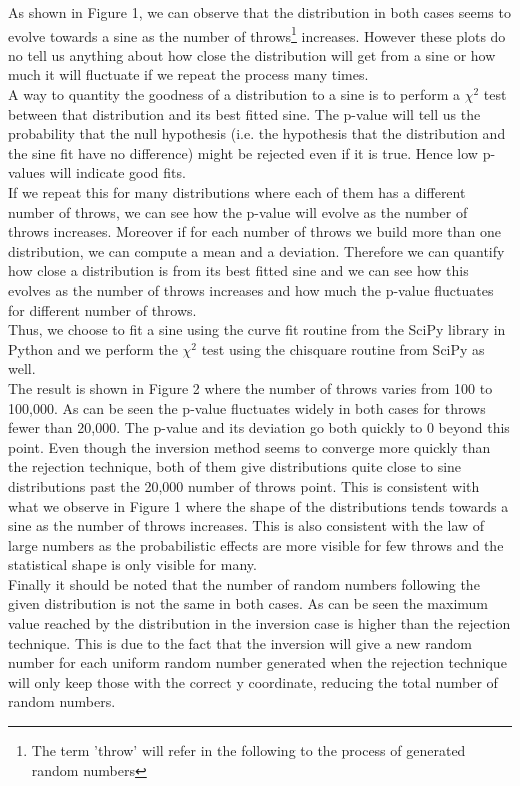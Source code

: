 \documentclass[10 pt]{article}
\numberwithin{equation}{section}
\begin{document}
\begin{multicols}{2}
As shown in Figure 1, we can observe that the distribution in both cases seems to evolve towards a sine as the number of throws\footnote{The term 'throw' will refer in the following to the process of generated random numbers} increases. However these plots do no tell us anything about how close the distribution will get from a sine or how much it will fluctuate if we repeat the process many times.\\
A way to quantity the goodness of a distribution to a sine is to perform a $\chi^2$\cite{Pvalue} test between that distribution and its best fitted sine. The p-value will tell us the probability that the null hypothesis (i.e. the hypothesis that the distribution and the sine fit have no difference) might be rejected even if it is true. Hence low p-values will indicate good fits.\\
If we repeat this for many distributions where each of them has a different number of throws, we can see how the p-value will evolve as the number of throws increases.
Moreover if for each number of throws we build more than one distribution, we can compute a mean and a deviation. Therefore we can quantify how close a distribution is from its best fitted sine and we can see how this evolves as the number of throws increases and how much the p-value fluctuates for different number of throws.
\\Thus, we choose to fit a sine using the curve fit routine from the SciPy library in Python\cite{CF} and we perform the $\chi^2$ test using the chisquare routine from SciPy\cite{CS} as well.\\
The result is shown in Figure 2 where the number of throws varies from 100 to 100,000. As can be seen the p-value fluctuates widely in both cases for throws fewer than 20,000. The p-value and its deviation go both quickly to 0 beyond this point. Even though the inversion method seems to converge more quickly than the rejection technique, both of them give distributions quite close to sine distributions past the 20,000 number of throws point. This is consistent with what we observe in Figure 1 where the shape of the distributions tends towards a sine as the number of throws increases. This is also consistent with the law of large numbers as the probabilistic effects are more visible for few throws and the statistical shape is only visible for many.\\
Finally it should be noted that the number of random numbers following the given distribution is not the same in both cases. As can be seen the maximum value reached by the distribution in the inversion case is higher than the rejection technique. This is due to the fact that the inversion will give a new random number for each uniform random number generated when the rejection technique will only keep those with the correct y coordinate, reducing the total number of random numbers.


\end{multicols}
\end{document}
